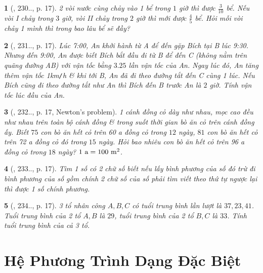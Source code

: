 \documentclass{article}
\newtheorem{baitoan}{}
\begin{document}
\begin{baitoan}[\cite{Binh_Toan_9_tap_2}, 230.., p. 17]
	2 vòi nước cùng chảy vào 1 bể trong $1$ giờ thì được $\frac{3}{10}$ bể. Nếu vòi I chảy trong $3$ giờ, vòi II chảy trong $2$ giờ thì mới được $\frac{4}{5}$ bể. Hỏi mỗi vòi chảy 1 mình thì trong bao lâu bể sẽ đầy?
\end{baitoan}

\begin{baitoan}[\cite{Binh_Toan_9_tap_2}, 231.., p. 17]
	Lúc {\rm7:00}, An khởi hành từ A để đến gặp Bích tại B lúc {\rm9:30}. Nhưng đến {\rm9:00}, An được biết Bích bắt đầu đi từ B để đến C (không nằm trên quãng đường AB) với vận tốc bằng $3.25$ lần vận tốc của An. Ngay lúc đó, An tăng thêm vận tốc {\rm1km{\tt/}h} \& khi tới B, An đã đi theo đường tắt đến C cùng 1 lúc. Nếu Bích cũng đi theo đường tắt như An thì Bích đến B trước An là $2$ giờ. Tính vận tốc lúc đầu của An.
\end{baitoan}

\begin{baitoan}[\cite{Binh_Toan_9_tap_2}, 232.., p. 17, Newton's problem]
	1 cánh đồng cỏ dày như nhau, mọc cao đều như nhau trên toàn bộ cánh đồng \& trong suốt thời gian bò ăn cỏ trên cánh đồng ấy. Biết $75$ con bò ăn hết cỏ trên {\rm60 a} đồng cỏ trong $12$ ngày, $81$ con bò ăn hết cỏ trên {\rm72 a} đồng cỏ đó trong $15$ ngày. Hỏi bao nhiêu con bò ăn hết cỏ trên {\rm96 a} đồng cỏ trong $18$ ngày? $\rm1\ a = 100\ m^2$.
\end{baitoan}

\begin{baitoan}[\cite{Binh_Toan_9_tap_2}, 233.., p. 17]
	Tìm 1 số có 2 chữ số biết nếu lấy bình phương của số đó trừ đi bình phương của số gồm chính 2 chữ số của số phải tìm viết theo thứ tự ngược lại thì được 1 số chính phương.
\end{baitoan}

\begin{baitoan}[\cite{Binh_Toan_9_tap_2}, 234.., p. 17]
	3 tổ nhân công $A,B,C$ có tuổi trung bình lần lượt là $37,23,41$. Tuổi trung bình của 2 tổ $A,B$ là $29$, tuổi trung bình của 2 tổ $B,C$ là $33$. Tính tuổi trung bình của cả 3 tổ.
\end{baitoan}


\section{Hệ Phương Trình Dạng Đặc Biệt}
\end{document}
